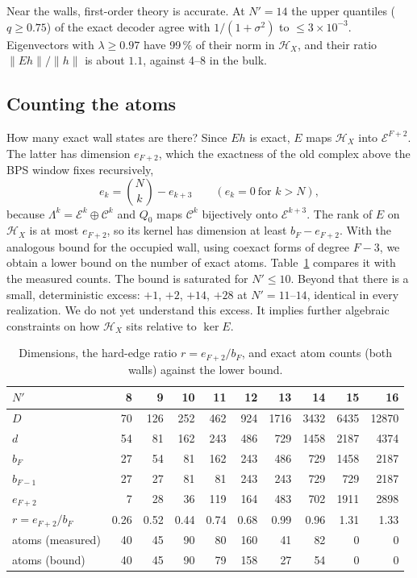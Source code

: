 \documentclass[11pt]{article}
\newcommand{\Np}{N'}
\newcommand{\Hc}{\mathcal H}
\newcommand{\Ec}{\mathcal E}
\newcommand{\Cc}{\mathcal C}
\theoremstyle{plain}
\theoremstyle{remark}
\numberwithin{equation}{section}
\begin{document}
Near the walls, first-order theory is accurate. At $\Np=14$ the upper quantiles ($q\ge0.75$) of the exact decoder agree with $1/(1+\sigma^2)$ to
$\le3\times10^{-3}$. Eigenvectors with $\lambda\ge0.97$ have 99\,\% of their norm in $\Hc_X$, and their ratio
$\|Eh\|/\|h\|$ is about $1.1$, against 4--8 in the bulk.

\subsection{Counting the atoms}

How many exact wall states are there? Since $Eh$ is exact, $E$ maps $\Hc_X$ into $\Ec^{F+2}$. The latter has dimension
$e_{F+2}$, which the exactness of the old complex above the BPS window fixes recursively,
\begin{equation}\label{eq:ek}
e_k=\binom Nk-e_{k+3}\qquad(e_k=0\ \text{for } k>N),
\end{equation}
because $\Lambda^k=\Ec^k\oplus\Cc^k$ and $Q_0$ maps $\Cc^k$ bijectively onto $\Ec^{k+3}$. The rank of $E$ on $\Hc_X$
is at most $e_{F+2}$, so its kernel has dimension at least $b_F-e_{F+2}$. With the analogous bound for the occupied wall,
using coexact forms of degree $F-3$, we obtain a lower bound on the number of exact atoms. Table~\ref{tab:dims} compares it
with the measured counts. The bound is saturated for $\Np\le10$. Beyond that there is a small, deterministic excess:
$+1$, $+2$, $+14$, $+28$ at $\Np=11$--$14$, identical in every realization. We do not yet understand this excess. It
implies further algebraic constraints on how $\Hc_X$ sits relative to $\ker E$.

\begin{table}[ht]
\centering\small
\caption{Dimensions, the hard-edge ratio $r=e_{F+2}/b_F$, and exact atom counts (both walls) against the lower bound.}
\label{tab:dims}
\begin{tabular}{lrrrrrrrrr}\toprule
$\Np$ & 8 & 9 & 10 & 11 & 12 & 13 & 14 & 15 & 16\\\midrule
$D$ & 70 & 126 & 252 & 462 & 924 & 1716 & 3432 & 6435 & 12870\\
$d$ & 54 & 81 & 162 & 243 & 486 & 729 & 1458 & 2187 & 4374\\
$b_F$ & 27 & 54 & 81 & 162 & 243 & 486 & 729 & 1458 & 2187\\
$b_{F-1}$ & 27 & 27 & 81 & 81 & 243 & 243 & 729 & 729 & 2187\\
$e_{F+2}$ & 7 & 28 & 36 & 119 & 164 & 483 & 702 & 1911 & 2898\\
$r=e_{F+2}/b_F$ & 0.26 & 0.52 & 0.44 & 0.74 & 0.68 & 0.99 & 0.96 & 1.31 & 1.33\\
atoms (measured) & 40 & 45 & 90 & 80 & 160 & 41 & 82 & 0 & 0\\
atoms (bound) & 40 & 45 & 90 & 79 & 158 & 27 & 54 & 0 & 0\\\bottomrule
\end{tabular}
\end{table}
\end{document}
